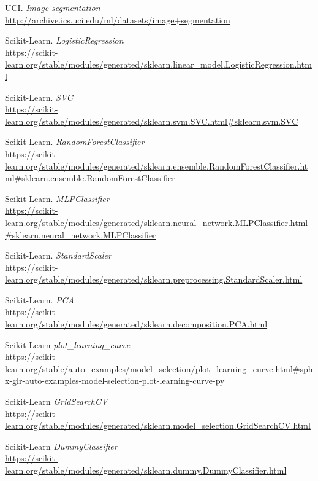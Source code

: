 \documentclass[11pt,a4paper]{article}
\begin{document}
\begin{thebibliography}{20}

UCI. \textit{Image segmentation}
\\\url{http://archive.ics.uci.edu/ml/datasets/image+segmentation}

Scikit-Learn. \textit{LogisticRegression}
\\\url{https://scikit-learn.org/stable/modules/generated/sklearn.linear_model.LogisticRegression.html}

Scikit-Learn. \textit{SVC}
\\\url{https://scikit-learn.org/stable/modules/generated/sklearn.svm.SVC.html#sklearn.svm.SVC}

Scikit-Learn. \textit{RandomForestClassifier}
\\\url{https://scikit-learn.org/stable/modules/generated/sklearn.ensemble.RandomForestClassifier.html#sklearn.ensemble.RandomForestClassifier}

Scikit-Learn. \textit{MLPClassifier}
\\\url{https://scikit-learn.org/stable/modules/generated/sklearn.neural_network.MLPClassifier.html#sklearn.neural_network.MLPClassifier}

Scikit-Learn. \textit{StandardScaler}
\\\url{https://scikit-learn.org/stable/modules/generated/sklearn.preprocessing.StandardScaler.html}

Scikit-Learn. \textit{PCA}
\\\url{https://scikit-learn.org/stable/modules/generated/sklearn.decomposition.PCA.html}

Scikit-Learn \textit{plot\_learning\_curve}
\\\url{https://scikit-learn.org/stable/auto_examples/model_selection/plot_learning_curve.html#sphx-glr-auto-examples-model-selection-plot-learning-curve-py}

Scikit-Learn \textit{GridSearchCV}
\\\url{https://scikit-learn.org/stable/modules/generated/sklearn.model_selection.GridSearchCV.html}

Scikit-Learn \textit{DummyClassifier}
\\\url{https://scikit-learn.org/stable/modules/generated/sklearn.dummy.DummyClassifier.html}

\end{thebibliography}
\end{document}
